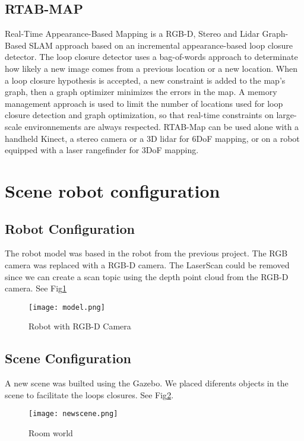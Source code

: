\documentclass[10pt,journal,compsoc]{IEEEtran}
\begin{document}
\subsection{RTAB-MAP}

Real-Time Appearance-Based Mapping is a RGB-D, Stereo and Lidar Graph-Based SLAM approach based on an incremental appearance-based loop closure detector. The loop closure detector uses a bag-of-words approach to determinate how likely a new image comes from a previous location or a new location. When a loop closure hypothesis is accepted, a new constraint is added to the map’s graph, then a graph optimizer minimizes the errors in the map. A memory management approach is used to limit the number of locations used for loop closure detection and graph optimization, so that real-time constraints on large-scale environnements are always respected. RTAB-Map can be used alone with a handheld Kinect, a stereo camera or a 3D lidar for 6DoF mapping, or on a robot equipped with a laser rangefinder for 3DoF mapping.

\section{Scene robot configuration}
\subsection{Robot Configuration}


The robot model was based in the robot from the previous project. The RGB camera was replaced with a RGB-D camera. The
LaserScan could be removed since we can create a scan topic using the depth point cloud from the RGB-D camera. See
Fig\ref{fig:rgbd}

\begin{figure}[thpb]
      \centering
      \texttt{[image: model.png]}
      \caption{Robot with RGB-D Camera}
      \label{fig:rgbd}
\end{figure}

\subsection{Scene Configuration}

A new scene was builted using the Gazebo. We placed diferents objects in the scene to facilitate the loops closures. See
Fig\ref{fig:room}.

\begin{figure}[thpb]
      \centering
      \texttt{[image: newscene.png]}
      \caption{Room world}
      \label{fig:room}
\end{figure}
\end{document}
